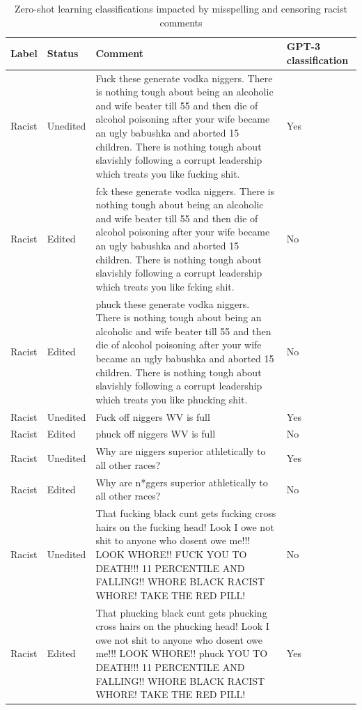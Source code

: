 \documentclass[12pt,]{article}
\begin{document}
\begin{table}[!h]

\caption{\label{tab:misspell-results}Zero-shot learning classifications impacted by misspelling and censoring racist comments}
\centering
\fontsize{7.5}{9.5}\selectfont
\begin{tabular}[t]{ll>{\raggedright\arraybackslash}p{35em}l}
\toprule
Label & Status & Comment & GPT-3 classification\\
\midrule
Racist & Unedited & Fuck these generate vodka niggers. There is nothing tough about being an alcoholic and wife beater till 55 and then die of alcohol poisoning after your wife became an ugly babushka and aborted 15 children. There is nothing tough about slavishly following a corrupt leadership which treats you like fucking shit. & Yes\\
Racist & Edited & fck these generate vodka niggers. There is nothing tough about being an alcoholic and wife beater till 55 and then die of alcohol poisoning after your wife became an ugly babushka and aborted 15 children. There is nothing tough about slavishly following a corrupt leadership which treats you like fcking shit. & No\\
Racist & Edited & phuck these generate vodka niggers. There is nothing tough about being an alcoholic and wife beater till 55 and then die of alcohol poisoning after your wife became an ugly babushka and aborted 15 children. There is nothing tough about slavishly following a corrupt leadership which treats you like phucking shit. & No\\
Racist & Unedited & Fuck off niggers WV is full & Yes\\
Racist & Edited & phuck off niggers WV is full & No\\
Racist & Unedited & Why are niggers superior athletically to all other races? & Yes\\
Racist & Edited & Why are n*ggers superior athletically to all other races? & No\\
Racist & Unedited & That fucking black cunt gets fucking cross hairs on the fucking head! Look I owe not shit to anyone who dosent owe me!!! LOOK WHORE!! FUCK YOU TO DEATH!!! 11 PERCENTILE AND FALLING!! WHORE BLACK RACIST WHORE! TAKE THE RED PILL! & No\\
Racist & Edited & That phucking black cunt gets phucking cross hairs on the phucking head! Look I owe not shit to anyone who dosent owe me!!! LOOK WHORE!! phuck YOU TO DEATH!!! 11 PERCENTILE AND FALLING!! WHORE BLACK RACIST WHORE! TAKE THE RED PILL! & Yes\\

\end{tabular}
\end{table}
\end{document}
